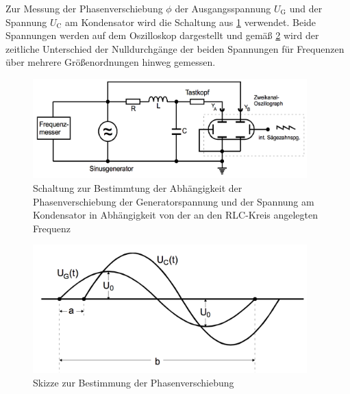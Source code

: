 Zur Messung der Phasenverschiebung $\phi$ der Ausgangsspannung $U_{\text{G}}$ und
der Spannung $U_{\text{C}}$ am Kondensator wird die Schaltung aus \ref{fig:aufbau_4} verwendet.
Beide Spannungen werden auf dem Oszilloskop dargestellt und gemäß \ref{fig:phasenverschiebung} wird der
zeitliche Unterschied der Nulldurchgänge der beiden Spannungen für Frequenzen
über mehrere Größenordnungen hinweg gemessen.
\begin{figure}
  \centering
  \includegraphics[width=300pt]{data/aufbau_4.png}
  \caption{Schaltung zur Bestimmtung der Abhängigkeit der Phasenverschiebung der
  Generatorspannung und der Spannung am Kondensator in Abhängigkeit von der
  an den RLC-Kreis angelegten Frequenz \cite{Versuchsanleitung1}}
  \label{fig:aufbau_4}
\end{figure}
\begin{figure}
  \centering
  \includegraphics[width=300pt]{data/phasenverschiebung.png}
  \caption{Skizze zur Bestimmung der Phasenverschiebung \cite{Versuchsanleitung2}}
  \label{fig:phasenverschiebung}
\end{figure}
